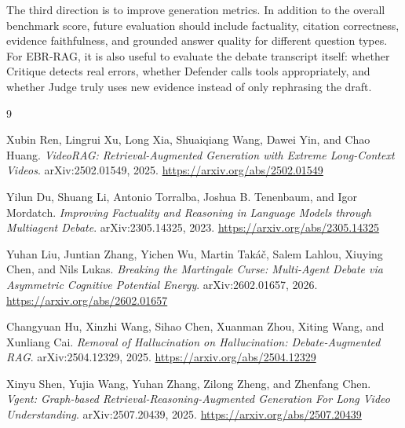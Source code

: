 \documentclass[12pt,a4paper]{article}
\begin{document}
The third direction is to improve generation metrics. In addition to the overall benchmark score, future evaluation should include factuality, citation correctness, evidence faithfulness, and grounded answer quality for different question types. For EBR-RAG, it is also useful to evaluate the debate transcript itself: whether Critique detects real errors, whether Defender calls tools appropriately, and whether Judge truly uses new evidence instead of only rephrasing the draft.

\begin{thebibliography}{9}

Xubin Ren, Lingrui Xu, Long Xia, Shuaiqiang Wang, Dawei Yin, and Chao Huang.
\textit{VideoRAG: Retrieval-Augmented Generation with Extreme Long-Context Videos}.
arXiv:2502.01549, 2025.
\url{https://arxiv.org/abs/2502.01549}

Yilun Du, Shuang Li, Antonio Torralba, Joshua B. Tenenbaum, and Igor Mordatch.
\textit{Improving Factuality and Reasoning in Language Models through Multiagent Debate}.
arXiv:2305.14325, 2023.
\url{https://arxiv.org/abs/2305.14325}

Yuhan Liu, Juntian Zhang, Yichen Wu, Martin Takáč, Salem Lahlou, Xiuying Chen, and Nils Lukas.
\textit{Breaking the Martingale Curse: Multi-Agent Debate via Asymmetric Cognitive Potential Energy}.
arXiv:2602.01657, 2026.
\url{https://arxiv.org/abs/2602.01657}

Changyuan Hu, Xinzhi Wang, Sihao Chen, Xuanman Zhou, Xiting Wang, and Xunliang Cai.
\textit{Removal of Hallucination on Hallucination: Debate-Augmented RAG}.
arXiv:2504.12329, 2025.
\url{https://arxiv.org/abs/2504.12329}

Xinyu Shen, Yujia Wang, Yuhan Zhang, Zilong Zheng, and Zhenfang Chen.
\textit{Vgent: Graph-based Retrieval-Reasoning-Augmented Generation For Long Video Understanding}.
arXiv:2507.20439, 2025.
\url{https://arxiv.org/abs/2507.20439}

\end{thebibliography}
\end{document}
